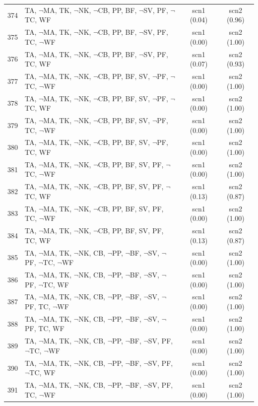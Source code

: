 \documentclass[12pt]{article}
\begin{document}
\begin{longtable}{|l|l|c|c|}
374 & TA, $\neg$MA, TK, $\neg$NK, $\neg$CB, PP, BF, $\neg$SV, PF, $\neg$TC, WF & scn1 (0.04) & scn2 (0.96)\\
375 & TA, $\neg$MA, TK, $\neg$NK, $\neg$CB, PP, BF, $\neg$SV, PF, TC, $\neg$WF & scn1 (0.00) & scn2 (1.00)\\
376 & TA, $\neg$MA, TK, $\neg$NK, $\neg$CB, PP, BF, $\neg$SV, PF, TC, WF & scn1 (0.07) & scn2 (0.93)\\
377 & TA, $\neg$MA, TK, $\neg$NK, $\neg$CB, PP, BF, SV, $\neg$PF, $\neg$TC, $\neg$WF & scn1 (0.00) & scn2 (1.00)\\
378 & TA, $\neg$MA, TK, $\neg$NK, $\neg$CB, PP, BF, SV, $\neg$PF, $\neg$TC, WF & scn1 (0.00) & scn2 (1.00)\\
379 & TA, $\neg$MA, TK, $\neg$NK, $\neg$CB, PP, BF, SV, $\neg$PF, TC, $\neg$WF & scn1 (0.00) & scn2 (1.00)\\
380 & TA, $\neg$MA, TK, $\neg$NK, $\neg$CB, PP, BF, SV, $\neg$PF, TC, WF & scn1 (0.00) & scn2 (1.00)\\
381 & TA, $\neg$MA, TK, $\neg$NK, $\neg$CB, PP, BF, SV, PF, $\neg$TC, $\neg$WF & scn1 (0.00) & scn2 (1.00)\\
382 & TA, $\neg$MA, TK, $\neg$NK, $\neg$CB, PP, BF, SV, PF, $\neg$TC, WF & scn1 (0.13) & scn2 (0.87)\\
383 & TA, $\neg$MA, TK, $\neg$NK, $\neg$CB, PP, BF, SV, PF, TC, $\neg$WF & scn1 (0.00) & scn2 (1.00)\\
384 & TA, $\neg$MA, TK, $\neg$NK, $\neg$CB, PP, BF, SV, PF, TC, WF & scn1 (0.13) & scn2 (0.87)\\
385 & TA, $\neg$MA, TK, $\neg$NK, CB, $\neg$PP, $\neg$BF, $\neg$SV, $\neg$PF, $\neg$TC, $\neg$WF & scn1 (0.00) & scn2 (1.00)\\
386 & TA, $\neg$MA, TK, $\neg$NK, CB, $\neg$PP, $\neg$BF, $\neg$SV, $\neg$PF, $\neg$TC, WF & scn1 (0.00) & scn2 (1.00)\\
387 & TA, $\neg$MA, TK, $\neg$NK, CB, $\neg$PP, $\neg$BF, $\neg$SV, $\neg$PF, TC, $\neg$WF & scn1 (0.00) & scn2 (1.00)\\
388 & TA, $\neg$MA, TK, $\neg$NK, CB, $\neg$PP, $\neg$BF, $\neg$SV, $\neg$PF, TC, WF & scn1 (0.00) & scn2 (1.00)\\
389 & TA, $\neg$MA, TK, $\neg$NK, CB, $\neg$PP, $\neg$BF, $\neg$SV, PF, $\neg$TC, $\neg$WF & scn1 (0.00) & scn2 (1.00)\\
390 & TA, $\neg$MA, TK, $\neg$NK, CB, $\neg$PP, $\neg$BF, $\neg$SV, PF, $\neg$TC, WF & scn1 (0.00) & scn2 (1.00)\\
391 & TA, $\neg$MA, TK, $\neg$NK, CB, $\neg$PP, $\neg$BF, $\neg$SV, PF, TC, $\neg$WF & scn1 (0.00) & scn2 (1.00)\\

\end{longtable}
\end{document}
